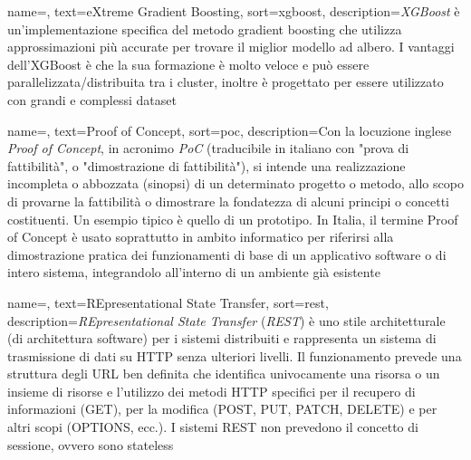 {
    name=,
    text=eXtreme Gradient Boosting,
    sort=xgboost,
    description={\textit{XGBoost} è un’implementazione specifica del metodo \gls{gradient boosting} che utilizza approssimazioni più accurate per trovare il miglior modello ad albero. I vantaggi dell'XGBoost è che la sua formazione è molto veloce e può essere parallelizzata/distribuita tra i cluster, inoltre è progettato per essere utilizzato con grandi e complessi dataset}
}

{
    name=,
    text=Proof of Concept,
    sort=poc,
    description={Con la locuzione inglese \textit{Proof of Concept}, in acronimo \textit{PoC} (traducibile in italiano con "prova di fattibilità", o "dimostrazione di fattibilità"), si intende una realizzazione incompleta o abbozzata (sinopsi) di un determinato progetto o metodo, allo scopo di provarne la fattibilità o dimostrare la fondatezza di alcuni principi o concetti costituenti. Un esempio tipico è quello di un prototipo. In Italia, il termine Proof of Concept è usato soprattutto in ambito informatico per riferirsi alla dimostrazione pratica dei funzionamenti di base di un applicativo software o di intero sistema, integrandolo all'interno di un ambiente già esistente}
}

{
    name=,
    text=REpresentational State Transfer,
    sort=rest,
    description={\textit{REpresentational State Transfer} (\textit{REST}) è uno stile architetturale (di architettura software) per i sistemi distribuiti e rappresenta un sistema di trasmissione di dati su HTTP senza ulteriori livelli. Il funzionamento prevede una struttura degli URL ben definita che identifica univocamente una risorsa o un insieme di risorse e l'utilizzo dei metodi HTTP specifici per il recupero di informazioni (GET), per la modifica (POST, PUT, PATCH, DELETE) e per altri scopi (OPTIONS, ecc.). I sistemi REST non prevedono il concetto di sessione, ovvero sono \gls{stateless}}
}
 




